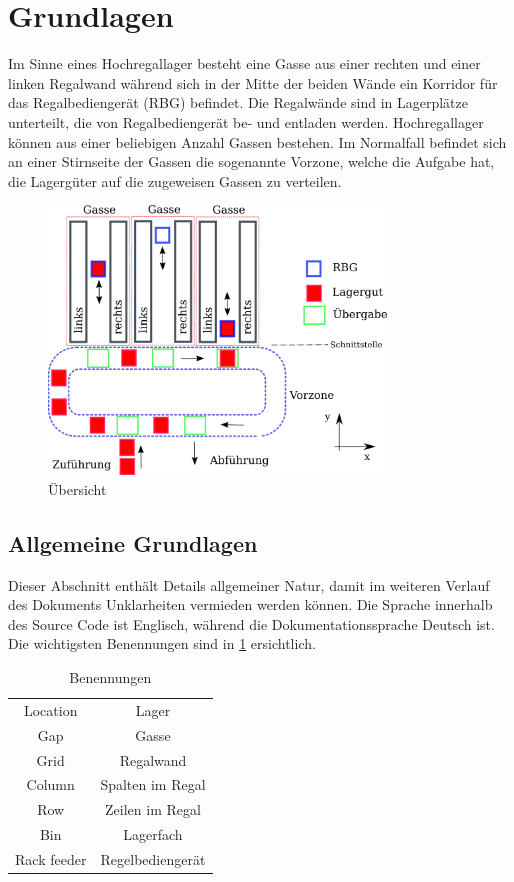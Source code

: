 \section{Grundlagen}
Im Sinne eines Hochregallager besteht eine Gasse aus einer rechten und einer linken Regalwand während sich in der Mitte der beiden Wände ein Korridor für das Regalbediengerät (RBG) befindet. Die Regalwände sind in Lagerplätze unterteilt, die von Regalbediengerät be- und entladen werden. Hochregallager können aus einer beliebigen Anzahl Gassen bestehen. Im Normalfall befindet sich an einer Stirnseite der Gassen die sogenannte Vorzone, welche die Aufgabe hat, die Lagergüter auf die zugeweisen Gassen zu verteilen. 
%
\begin{figure}[H]
  \begin{center}
    \includegraphics[width=0.8\textwidth]{images/uebersicht.png}
    \caption{Übersicht}
    \label{fig:overview}
  \end{center}
\end{figure}
%

%
\subsection{Allgemeine Grundlagen}
Dieser Abschnitt enthält Details allgemeiner Natur, damit im weiteren Verlauf des Dokuments Unklarheiten vermieden werden können. Die Sprache innerhalb des Source Code ist Englisch, während die Dokumentationssprache Deutsch ist. Die wichtigsten Benennungen sind in \ref{tab:desc} ersichtlich.
%
\begin{table}[H]
  \caption{Benennungen}
  \label{tab:desc}

  \begin{center}
    \begin{tabular}{cc}
       Location & Lager\\
       Gap & Gasse\\
       Grid & Regalwand \\
       Column & Spalten im Regal \\
       Row & Zeilen im Regal \\
       Bin & Lagerfach \\
       Rack feeder & Regelbediengerät \\
    \end{tabular}
  \end{center}
\end{table}
%
